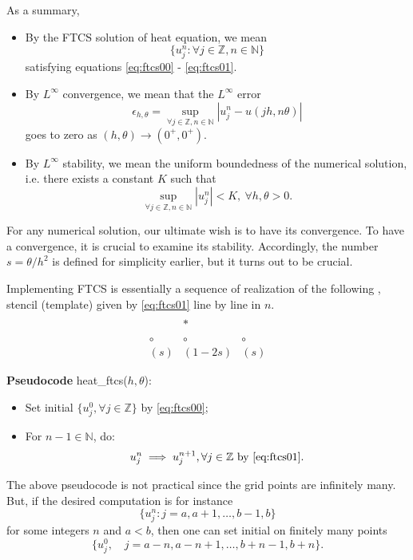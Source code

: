 \documentclass{article}
\begin{document}
As a summary, 
\begin{itemize}
 \item By the FTCS solution of heat equation, we mean 
 $$\{u_{j}^{n}: \forall j\in \mathbb Z, n \in \mathbb N \}$$ satisfying
 equations \eqref{eq:ftcs00} - \eqref{eq:ftcs01}.
 
 \item By $L^{\infty}$ convergence, we mean that the $L^{\infty}$ error 
 $$\epsilon_{h, \theta} = 
 \sup_{ \forall j\in \mathbb Z, n \in \mathbb N }
 | u_{j}^{n} - u(jh, n\theta) |
 $$
 goes to zero as $(h, \theta) \to (0^{+}, 0^{+})$.
 
 \item By $L^{\infty}$ stability, we mean the uniform boundedness of the numerical solution, i.e. there exists a constant $K$ such that
 $$\sup_{ \forall j\in \mathbb Z, n \in \mathbb N }
 | u_{j}^{n}| < K, \ \forall h, \theta>0.$$
\end{itemize}

For any numerical solution, our ultimate wish is to have its convergence.
To have a convergence, it is crucial to examine its stability. 
Accordingly, the number $s = \theta/h^{2}$ is defined for simplicity earlier, 
but it turns out to be crucial.

Implementing FTCS is essentially  a sequence of realization of the following , stencil (template) given by \eqref{eq:ftcs01} line by line in $n$.
$$
\begin{array}
 {ccc}
 \\
 & * & 
 \\
 \\
 \circ  & \circ & \circ
 \\
(s) &  (1-2s) &  (s)
\end{array}
$$

{\bf Pseudocode} heat\_ftcs($h, \theta$):
\begin{itemize}
 \item Set initial $\{u_{j}^{0}, \forall j \in \mathbb Z\}$ by \eqref{eq:ftcs00};
 \item For $n-1 \in \mathbb N$, do:
 $$u_{j}^{n} \implies u_{j}^{n+1}, \forall j  \in \mathbb Z \hbox{ by \eqref{eq:ftcs01}}.$$
\end{itemize}

The above pseudocode is not practical since the grid points are infinitely many. But, if the desired computation is for instance
$$\{u_{j}^{n}: j = a, a+1, \ldots, b-1, b\}$$
for some integers $n$ and $a<b$, then one can set initial on finitely many points
$$\{u_{j}^{0}, \quad j = a-n, a-n+1, \ldots, b+n-1, b+n\}.$$
\end{document}
